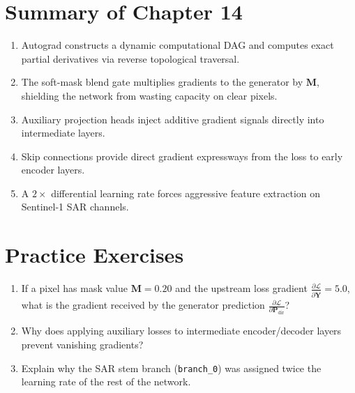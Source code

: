 \section{Summary of Chapter 14}
\begin{enumerate}
    \item Autograd constructs a dynamic computational DAG and computes exact partial derivatives via reverse topological traversal.
    \item The soft-mask blend gate multiplies gradients to the generator by $\mathbf{M}$, shielding the network from wasting capacity on clear pixels.
    \item Auxiliary projection heads inject additive gradient signals directly into intermediate layers.
    \item Skip connections provide direct gradient expressways from the loss to early encoder layers.
    \item A $2\times$ differential learning rate forces aggressive feature extraction on Sentinel-1 SAR channels.
\end{enumerate}

\section{Practice Exercises}
\begin{enumerate}
    \item If a pixel has mask value $\mathbf{M} = 0.20$ and the upstream loss gradient $\frac{\partial \mathcal{L}}{\partial \hat{\mathbf{Y}}} = 5.0$, what is the gradient received by the generator prediction $\frac{\partial \mathcal{L}}{\partial \mathbf{P}_{\text{dir}}}$?
    \item Why does applying auxiliary losses to intermediate encoder/decoder layers prevent vanishing gradients?
    \item Explain why the SAR stem branch (\texttt{branch\_0}) was assigned twice the learning rate of the rest of the network.
\end{enumerate}

